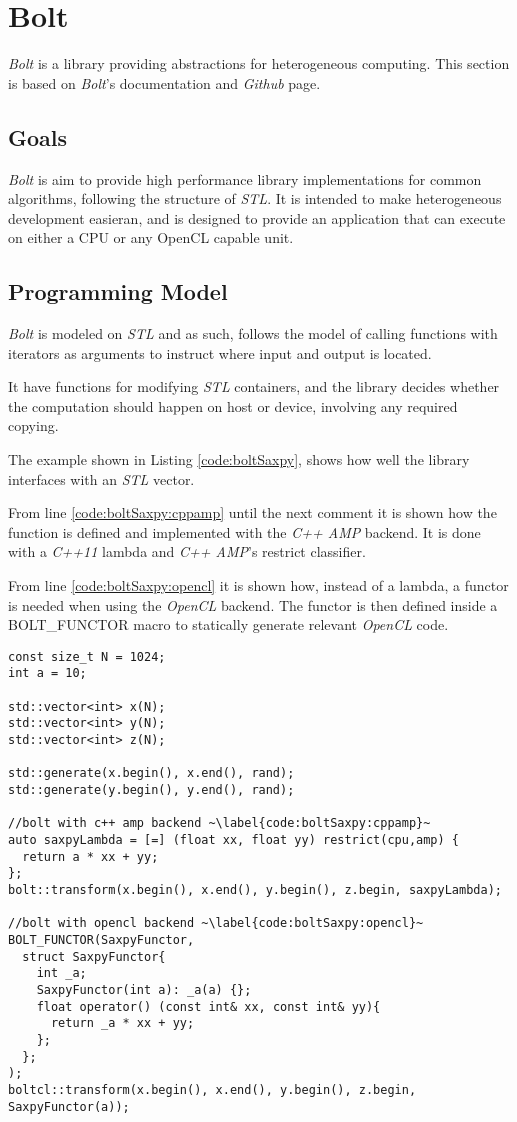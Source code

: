 \section{Bolt}
\textit{Bolt} is a library providing abstractions for heterogeneous computing. This section is based on \textit{Bolt}'s documentation\cite{boltDoc} and \textit{Github} page\cite{boltGithub}.

\subsection{Goals}
\textit{Bolt} is aim to provide high performance library implementations for common algorithms, following the structure of \textit{STL}. It is intended to make heterogeneous development easieran, and is designed to provide an application that can execute on either a CPU or any OpenCL capable unit.

\subsection{Programming Model}
\textit{Bolt} is modeled on \textit{STL} and as such, follows the model of calling functions with iterators as arguments to instruct where input and output is located.

It have functions for modifying \textit{STL} containers, and the library decides whether the computation should happen on host or device, involving any required copying.

The example shown in Listing \ref{code:boltSaxpy}, shows how well the library interfaces with an \textit{STL} vector.

From line \ref{code:boltSaxpy:cppamp} until the next comment it is shown how the function is defined and implemented with the \textit{C++ AMP} backend. It is done with a \textit{C++11} lambda and \textit{C++ AMP}'s restrict classifier.

From line \ref{code:boltSaxpy:opencl} it is shown how, instead of a lambda, a functor is needed when using the \textit{OpenCL} backend. The functor is then defined inside a BOLT\_FUNCTOR macro to statically generate relevant \textit{OpenCL} code.

\begin{lstlisting}[caption={Bolt \textit{SAXPY} example}, label={code:boltSaxpy}]
const size_t N = 1024;
int a = 10;

std::vector<int> x(N);
std::vector<int> y(N);
std::vector<int> z(N);

std::generate(x.begin(), x.end(), rand);
std::generate(y.begin(), y.end(), rand);

//bolt with c++ amp backend ~\label{code:boltSaxpy:cppamp}~
auto saxpyLambda = [=] (float xx, float yy) restrict(cpu,amp) {
  return a * xx + yy;
};
bolt::transform(x.begin(), x.end(), y.begin(), z.begin, saxpyLambda);

//bolt with opencl backend ~\label{code:boltSaxpy:opencl}~
BOLT_FUNCTOR(SaxpyFunctor,
  struct SaxpyFunctor{
    int _a;
    SaxpyFunctor(int a): _a(a) {};
    float operator() (const int& xx, const int& yy){
      return _a * xx + yy;
    };
  };
);
boltcl::transform(x.begin(), x.end(), y.begin(), z.begin, SaxpyFunctor(a));
\end{lstlisting}

